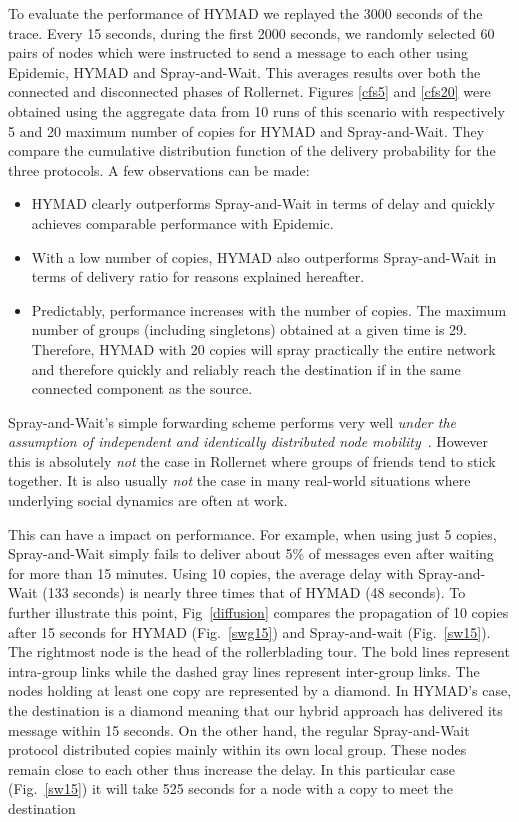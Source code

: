 \documentclass[10pt,twocolumn,letterpaper]{article}
\begin{document}
To evaluate the performance of HYMAD we replayed the 3000 seconds of
the trace.  Every 15 seconds, during the first 2000 seconds, we
randomly selected 60 pairs of nodes which were instructed to send a
message to each other using Epidemic, HYMAD and Spray-and-Wait. This
averages results over both the connected and disconnected phases of
Rollernet. Figures \ref{cfs5} and \ref{cfs20} were obtained using the
aggregate data from 10 runs of this scenario with respectively 5 and
20 maximum number of copies for HYMAD and Spray-and-Wait. They compare
the cumulative distribution function of the delivery probability for
the three protocols. A few observations can be made:
\begin{itemize}
\item HYMAD clearly outperforms Spray-and-Wait in terms of delay and
  quickly achieves comparable performance with Epidemic.
\item With a low number of copies, HYMAD also outperforms
  Spray-and-Wait in terms of delivery ratio for reasons explained
  hereafter.
\item Predictably, performance increases with the number of
  copies. The maximum number of groups (including singletons) obtained
  at a given time is 29. Therefore, HYMAD with 20 copies will spray
  practically the entire network and therefore quickly and reliably
  reach the destination if in the same connected component as the
  source.
\end{itemize}

Spray-and-Wait's simple forwarding scheme performs very well
\emph{under the assumption of independent and identically distributed
  node mobility}~\cite{spyro_sw}. However this is absolutely
\emph{not} the case in Rollernet where groups of friends tend to stick
together. It is also usually \emph{not} the case in many real-world
situations where underlying social dynamics are often at work.

This can have a impact on performance. For example, when using just 5
copies, Spray-and-Wait simply fails to deliver about 5\% of messages
even after waiting for more than 15 minutes. Using 10 copies, the
average delay with Spray-and-Wait (133 seconds) is nearly three times
that of HYMAD (48 seconds). To further illustrate this point,
Fig~\ref{diffusion} compares the propagation of 10 copies after 15
seconds for HYMAD (Fig.~\ref{swg15}) and Spray-and-wait
(Fig.~\ref{sw15}). The rightmost node is the head of the rollerblading
tour. The bold lines represent intra-group links while the dashed gray
lines represent inter-group links. The nodes holding at least one copy
are represented by a diamond. In HYMAD's case, the destination is a
diamond meaning that our hybrid approach has delivered its message
within 15 seconds. On the other hand, the regular Spray-and-Wait
protocol distributed copies mainly within its own local group. These
nodes remain close to each other thus increase the delay. In this
particular case (Fig.~\ref{sw15}) it will take 525 seconds for a node
with a copy to meet the destination
\end{document}
